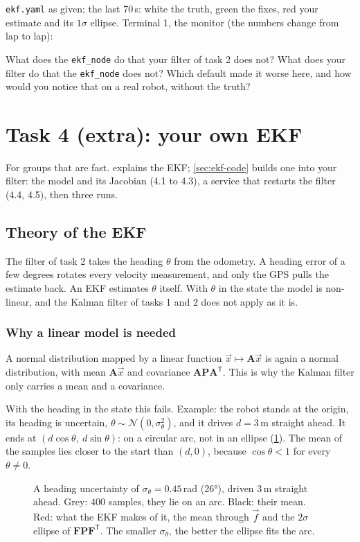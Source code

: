 \documentclass[11pt,a4paper,parskip=half]{scrartcl}
\newcommand{\thema}[1]{\texttt{#1}}
\newcommand{\datei}[1]{\texttt{#1}}
\newcommand{\mat}[1]{\mathbf{#1}}
\newcommand{\T}{^{\mathsf{T}}}
\newcommand{\solution}[1]{\ifdefined\withsolution\InputIfFileExists{solutions/#1}{}{}\fi}
\newcommand{\expected}[2][]{\begin{seebox}
  \centering\resizebox{0.5\linewidth}{!}{}\par\smallskip
  \raggedright{\footnotesize\color{ohmgrey}#1the last 70\,s: white the truth, green the fixes, red your
    estimate and its \(1\sigma\) ellipse. Terminal 1, the monitor (the numbers change from lap to lap):}
  
\end{seebox}}
\begin{document}
\expected[\datei{ekf.yaml} as given; ]{ekf}

\begin{checkpoint}
What does the \thema{ekf\_node} do that your filter of task 2 does not? What does your filter do that the
\thema{ekf\_node} does not? Which default made it worse here, and how would you notice that on a real robot,
without the truth?
\end{checkpoint}
\solution{task3}

\newpage
\section{Task 4 (extra): your own EKF}
\label{sec:task4}
For groups that are fast.  explains the EKF; \cref{sec:ekf-code} builds one into your
filter: the model and its Jacobian (4.1 to 4.3), a service that restarts the filter (4.4, 4.5), then three runs.

\subsection{Theory of the EKF}
\label{sec:ekf-theory}
The filter of task 2 takes the heading \(\theta\) from the odometry. A heading error of a few degrees rotates
every velocity measurement, and only the GPS pulls the estimate back. An EKF estimates \(\theta\) itself. With
\(\theta\) in the state the model is non-linear, and the Kalman filter of tasks 1 and 2 does not apply as it is.

\subsubsection*{Why a linear model is needed}
A normal distribution mapped by a linear function \(\vec x \mapsto \mat A \vec x\) is again a normal
distribution, with mean \(\mat A \vec x\) and covariance \(\mat A \mat P \mat A\T\). This is why the Kalman filter
only carries a mean and a covariance.

With the heading in the state this fails. Example: the robot stands at the origin, its heading is uncertain,
\(\theta \sim \mathcal N(0, \sigma_\theta^2)\), and it drives \(d = 3\)\,m straight ahead. It ends at
\((d\cos\theta,\ d\sin\theta)\): on a circular arc, not in an ellipse (\cref{fig:banana}). The mean of the samples lies
closer to the start than \((d, 0)\), because \(\cos\theta < 1\) for every \(\theta \neq 0\).

\begin{figure}[ht]
  \centering
  
  \caption{A heading uncertainty of \(\sigma_\theta = 0.45\)\,rad (26°), driven 3\,m straight ahead. Grey: 400 samples,
    they lie on an arc. Black: their mean. Red: what the EKF makes of it, the mean through \(\vec f\) and the
    \(2\sigma\) ellipse of \(\mat F \mat P \mat F\T\). The smaller \(\sigma_\theta\), the better the ellipse fits the arc.}
  \label{fig:banana}
\end{figure}
\end{document}
